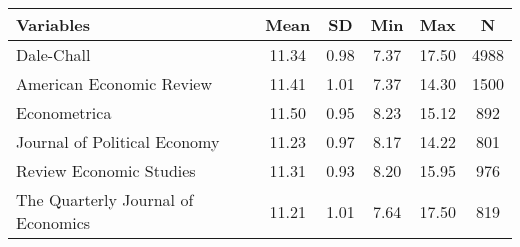 \begin{tabular}{lccccc}
\toprule
Variables & Mean & SD & Min & Max & N \\
\midrule
Dale-Chall & 11.34 & 0.98 & 7.37 & 17.50 & 4988 \\
\hspace{3mm}American Economic Review & 11.41 & 1.01 & 7.37 & 14.30 & 1500 \\
\hspace{3mm}Econometrica & 11.50 & 0.95 & 8.23 & 15.12 & 892 \\
\hspace{3mm}Journal of Political Economy & 11.23 & 0.97 & 8.17 & 14.22 & 801 \\
\hspace{3mm}Review Economic Studies & 11.31 & 0.93 & 8.20 & 15.95 & 976 \\
\hspace{3mm}The Quarterly Journal of Economics & 11.21 & 1.01 & 7.64 & 17.50 & 819 \\
\bottomrule
\end{tabular}
